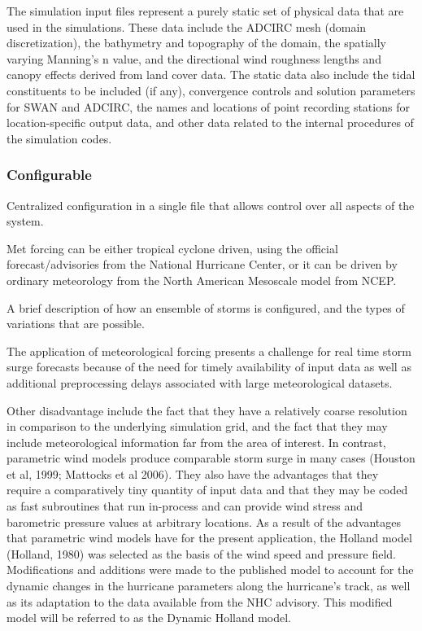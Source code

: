 \documentclass[12pt]{article}
\begin{document}
The simulation input files represent a purely static set of physical 
data that are used in the simulations. These data include the ADCIRC 
mesh (domain discretization), the bathymetry and topography of the 
domain, the spatially varying Manning's n value, and the directional 
wind roughness lengths and canopy effects derived from land cover 
data. The static data also include the tidal constituents to be 
included (if any), convergence controls and solution parameters for 
SWAN and ADCIRC, the names and locations of point recording stations 
for location-specific output data, and other data related to the 
internal procedures of the simulation codes. 

\subsubsection{Configurable}

Centralized configuration in a single file that allows control over all
aspects of the system. 

Met forcing can be either tropical cyclone driven, using the official 
forecast/advisories from the National Hurricane Center, or it can be 
driven by ordinary meteorology from the North American Mesoscale model 
from NCEP.

A brief description of how an ensemble of storms is configured, 
and the types of variations that are possible. 

The application of meteorological forcing presents a challenge for 
real time storm surge forecasts because of the need for timely 
availability of input data as well as additional preprocessing 
delays associated with large meteorological datasets. 

Other disadvantage include the fact that they have a relatively 
coarse resolution in comparison to the underlying simulation grid, 
and the fact that they may include meteorological information far 
from the area of interest. In contrast, parametric wind models 
produce comparable storm surge in many cases (Houston et al, 1999; 
Mattocks et al 2006). They also have the advantages that they 
require a comparatively tiny quantity of input data and that they 
may be coded as fast subroutines that run in-process and can provide 
wind stress and barometric pressure values at arbitrary locations. 
As a result of the advantages that parametric wind models have for 
the present application, the Holland model (Holland, 1980) was 
selected as the basis of the wind speed and pressure field. 
Modifications and additions were made to the published model to 
account for the dynamic changes in the hurricane parameters along 
the hurricane’s track, as well as its adaptation to the data 
available from the NHC advisory. This modified model will be 
referred to as the Dynamic Holland model.
\end{document}
